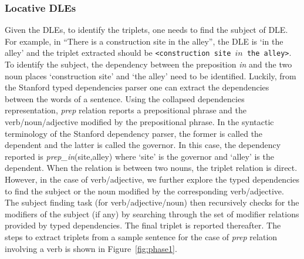 \documentclass[letter]{sig-alternate}
\begin{document}
\subsubsection*{Locative DLEs}
Given the DLEs, to identify the triplets, one needs to find the subject of DLE. For example, in ``There is a construction site in the alley'', the DLE is `in the alley' and the triplet extracted should be \texttt{<construction site $in$ the alley>}. To  identify the subject, the dependency between the preposition \textit{in} and the two noun places `construction site' and `the alley' need to be identified. Luckily, from the Stanford typed dependencies parser \cite{marneffe:stanford} one can extract the dependencies between the words of a sentence. Using the collapsed dependencies representation, \textit{prep} relation reports a prepositional phrase and the verb/noun/adjective modified by the prepositional phrase. In the syntactic terminology of the Stanford dependency parser, the former is called the dependent and the latter is called the governor. In this case, the dependency reported is \textit{prep\_in}(site,alley) where `site' is the governor and `alley' is the dependent. When the relation is between two nouns, the triplet relation is direct.
However, in the case of verb/adjective, we further explore the typed dependencies to find the subject or the noun modified by the corresponding verb/adjective. The subject finding task (for verb/adjective/noun) then recursively checks for the modifiers of the subject (if any) by searching through the set of modifier relations provided by typed dependencies. The final triplet is reported thereafter. The steps to extract triplets from a sample sentence for the case of \textit{prep} relation involving a verb is shown in Figure~\ref{fig:phase1}.
\end{document}
